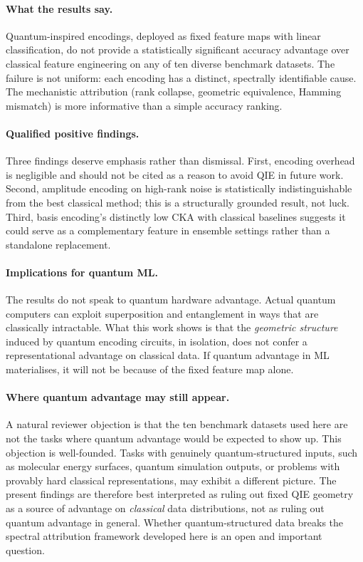 \documentclass[12pt]{article}
\begin{document}
\paragraph{What the results say.}
Quantum-inspired encodings, deployed as fixed feature maps with linear
classification, do not provide a statistically significant accuracy advantage
over classical feature engineering on any of ten diverse benchmark datasets.
The failure is not uniform: each encoding has a distinct, spectrally
identifiable cause.
The mechanistic attribution (rank collapse, geometric equivalence, Hamming
mismatch) is more informative than a simple accuracy ranking.

\paragraph{Qualified positive findings.}
Three findings deserve emphasis rather than dismissal.
First, encoding overhead is negligible and should not be cited as a reason to
avoid QIE in future work.
Second, amplitude encoding on high-rank noise is statistically
indistinguishable from the best classical method; this is a structurally
grounded result, not luck.
Third, basis encoding's distinctly low CKA with classical baselines suggests
it could serve as a complementary feature in ensemble settings rather than a
standalone replacement.

\paragraph{Implications for quantum ML.}
The results do not speak to quantum hardware advantage.
Actual quantum computers can exploit superposition and entanglement in ways
that are classically intractable.
What this work shows is that the \emph{geometric structure} induced by quantum
encoding circuits, in isolation, does not confer a representational advantage
on classical data.
If quantum advantage in ML materialises, it will not be because of the fixed
feature map alone.

\paragraph{Where quantum advantage may still appear.}
A natural reviewer objection is that the ten benchmark datasets used here
are not the tasks where quantum advantage would be expected to show up.
This objection is well-founded.
Tasks with genuinely quantum-structured inputs, such as molecular energy
surfaces, quantum simulation outputs, or problems with provably hard classical
representations, may exhibit a different picture.
The present findings are therefore best interpreted as ruling out fixed QIE
geometry as a source of advantage on \emph{classical} data distributions, not
as ruling out quantum advantage in general.
Whether quantum-structured data breaks the spectral attribution framework
developed here is an open and important question.
\end{document}
